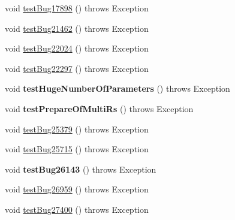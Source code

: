 \begin{DoxyCompactItemize}
\item 
void \mbox{\hyperlink{classtestsuite_1_1regression_1_1_callable_statement_regression_test_a32278d6baf7013d850879cfd634b38cc}{test\+Bug17898}} ()  throws Exception 
\item 
void \mbox{\hyperlink{classtestsuite_1_1regression_1_1_callable_statement_regression_test_abb265c7a921933c8ecde8c1c12441513}{test\+Bug21462}} ()  throws Exception 
\item 
void \mbox{\hyperlink{classtestsuite_1_1regression_1_1_callable_statement_regression_test_a32068ab38e449a082792fc6fcd779fb3}{test\+Bug22024}} ()  throws Exception 
\item 
void \mbox{\hyperlink{classtestsuite_1_1regression_1_1_callable_statement_regression_test_a601d825ec8a6e6d2a5e2d3141e9355b4}{test\+Bug22297}} ()  throws Exception 
\item 
\mbox{\label{classtestsuite_1_1regression_1_1_callable_statement_regression_test_af2d71c7927c0532faaec78a0d07f1646}} 
void {\bfseries test\+Huge\+Number\+Of\+Parameters} ()  throws Exception 
\item 
\mbox{\label{classtestsuite_1_1regression_1_1_callable_statement_regression_test_aae08f07ea8a89cbb94d2b62326904991}} 
void {\bfseries test\+Prepare\+Of\+Multi\+Rs} ()  throws Exception 
\item 
void \mbox{\hyperlink{classtestsuite_1_1regression_1_1_callable_statement_regression_test_a8603b59f7d522506f151fce4db9e7fe7}{test\+Bug25379}} ()  throws Exception 
\item 
void \mbox{\hyperlink{classtestsuite_1_1regression_1_1_callable_statement_regression_test_af26c483761c1cc584287d8a35c4f82db}{test\+Bug25715}} ()  throws Exception 
\item 
\mbox{\label{classtestsuite_1_1regression_1_1_callable_statement_regression_test_acef13cfb17782dc6d9bc0aa4a289214f}} 
void {\bfseries test\+Bug26143} ()  throws Exception 
\item 
void \mbox{\hyperlink{classtestsuite_1_1regression_1_1_callable_statement_regression_test_a5184b94848dc877dcda10b8a55c6979f}{test\+Bug26959}} ()  throws Exception 
\item 
void \mbox{\hyperlink{classtestsuite_1_1regression_1_1_callable_statement_regression_test_a7980f197d22b9ff9cb6bcd2efe5848a6}{test\+Bug27400}} ()  throws Exception 

\end{DoxyCompactItemize}

